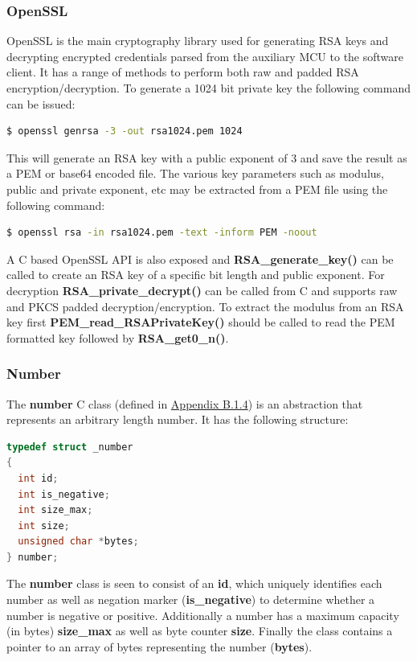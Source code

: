 \subsubsection{OpenSSL}
OpenSSL is the main cryptography library used for generating RSA keys and decrypting encrypted credentials parsed from the auxiliary MCU to the software client. It has a range of methods to perform both raw and padded RSA encryption/decryption. To generate a 1024 bit private key the following command can be issued:
\begin{lstlisting}[language=bash, frame=none]
$ openssl genrsa -3 -out rsa1024.pem 1024
\end{lstlisting}

This will generate an RSA key with a public exponent of 3 and save the result as a PEM or base64 encoded file. The various key parameters such as modulus, public and private exponent, etc may be extracted from a PEM file using the following command:
\begin{lstlisting}[language=bash, frame=none]
$ openssl rsa -in rsa1024.pem -text -inform PEM -noout
\end{lstlisting}

A C based OpenSSL API is also exposed and \textbf{RSA\_generate\_key()} can be called to create an RSA key of a specific bit length and public exponent. For decryption \textbf{RSA\_private\_decrypt()} can be called from C and supports raw and PKCS padded decryption/encryption. To extract the modulus from an RSA key first \textbf{PEM\_read\_RSAPrivateKey()} should be called to read the PEM formatted key followed by \textbf{RSA\_get0\_n()}.
\subsubsection{Number}

The \textbf{number} C class (defined in \hyperref[sec:rsacpp]{Appendix B.1.4}) is an abstraction that represents an arbitrary length number. It has the following structure:
\begin{lstlisting}[language=C]
typedef struct _number
{
  int id;
  int is_negative;
  int size_max;
  int size;
  unsigned char *bytes;
} number;
\end{lstlisting}

The \textbf{number} class is seen to consist of an \textbf{id}, which uniquely identifies each number as well as negation marker (\textbf{is\_negative}) to determine whether a number is negative or positive. Additionally a number has a maximum capacity (in bytes) \textbf{size\_max} as well as byte counter \textbf{size}. Finally the class contains a pointer to an array of bytes representing the number (\textbf{bytes}).

